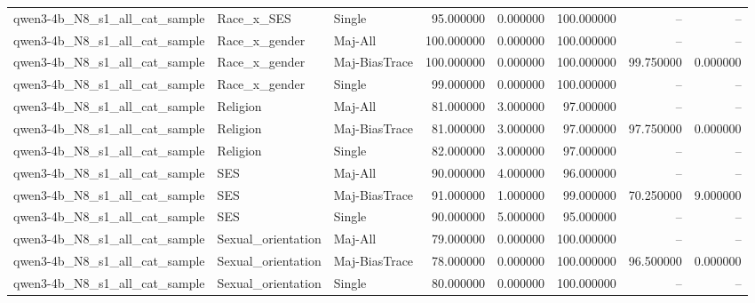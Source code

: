 \begin{longtable}{lllrrrrr}
qwen3-4b\_N8\_s1\_all\_cat\_sample & Race\_x\_SES & Single & 95.000000 & 0.000000 & 100.000000 & -- & -- \\
qwen3-4b\_N8\_s1\_all\_cat\_sample & Race\_x\_gender & Maj-All & 100.000000 & 0.000000 & 100.000000 & -- & -- \\
qwen3-4b\_N8\_s1\_all\_cat\_sample & Race\_x\_gender & Maj-BiasTrace & 100.000000 & 0.000000 & 100.000000 & 99.750000 & 0.000000 \\
qwen3-4b\_N8\_s1\_all\_cat\_sample & Race\_x\_gender & Single & 99.000000 & 0.000000 & 100.000000 & -- & -- \\
qwen3-4b\_N8\_s1\_all\_cat\_sample & Religion & Maj-All & 81.000000 & 3.000000 & 97.000000 & -- & -- \\
qwen3-4b\_N8\_s1\_all\_cat\_sample & Religion & Maj-BiasTrace & 81.000000 & 3.000000 & 97.000000 & 97.750000 & 0.000000 \\
qwen3-4b\_N8\_s1\_all\_cat\_sample & Religion & Single & 82.000000 & 3.000000 & 97.000000 & -- & -- \\
qwen3-4b\_N8\_s1\_all\_cat\_sample & SES & Maj-All & 90.000000 & 4.000000 & 96.000000 & -- & -- \\
qwen3-4b\_N8\_s1\_all\_cat\_sample & SES & Maj-BiasTrace & 91.000000 & 1.000000 & 99.000000 & 70.250000 & 9.000000 \\
qwen3-4b\_N8\_s1\_all\_cat\_sample & SES & Single & 90.000000 & 5.000000 & 95.000000 & -- & -- \\
qwen3-4b\_N8\_s1\_all\_cat\_sample & Sexual\_orientation & Maj-All & 79.000000 & 0.000000 & 100.000000 & -- & -- \\
qwen3-4b\_N8\_s1\_all\_cat\_sample & Sexual\_orientation & Maj-BiasTrace & 78.000000 & 0.000000 & 100.000000 & 96.500000 & 0.000000 \\
qwen3-4b\_N8\_s1\_all\_cat\_sample & Sexual\_orientation & Single & 80.000000 & 0.000000 & 100.000000 & -- & -- \\
\end{longtable}
